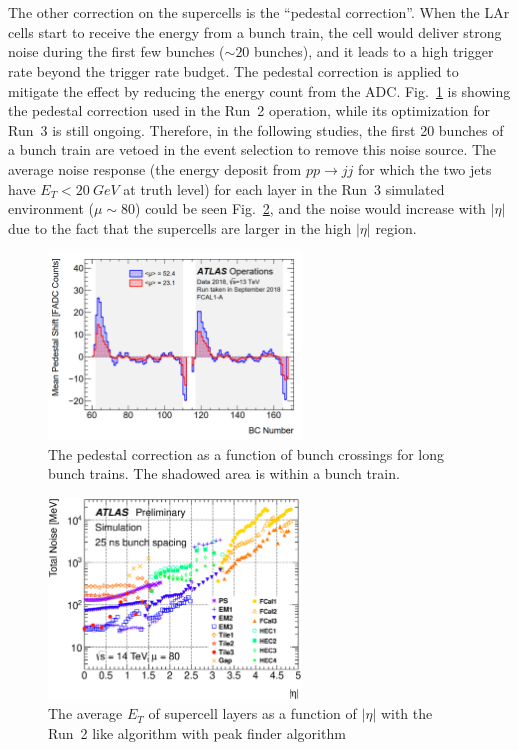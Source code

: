 \noindent
\\
\\The other correction on the supercells is the ``pedestal correction''. When the LAr cells start to receive the energy from a bunch train, the cell would deliver strong noise during the first few bunches ($\sim 20$ bunches), and it leads to a high trigger rate beyond the trigger rate budget. The pedestal correction is applied to mitigate the effect by reducing the energy count from the ADC. Fig.~\ref{Fig:pc} is showing the pedestal correction used in the Run~2 operation, while its optimization for Run~3 is still ongoing. Therefore, in the following studies, the first 20 bunches of a bunch train are vetoed in the event selection to remove this noise source. The average noise response (the energy deposit from $pp\to jj$ for which the two jets have $E_{T}<20~GeV$ at truth level) for each layer in the Run~3 simulated environment ($\mu\sim80$) could be seen Fig.~\ref{Fig:sc_noise}, and the noise would increase with $|\eta|$ due to the fact that the supercells are larger in the high $|\eta|$ region.
\begin{figure}[!h]                
  	\includegraphics[width=0.6\textwidth]{Chapter6/pedestalCorr.png}
  	\begin{center}
  		\caption{The pedestal correction as a function of bunch crossings for long bunch trains. The shadowed area is within a bunch train\cite{Jongmanns:2661780}.}
  		\label{Fig:pc}            
  	\end{center}
\end{figure}
\begin{figure}[!h]                
	\includegraphics[width=0.6\textwidth]{Chapter6/noise_tot_plot_OFLCOND-MC12-HPS-19-60-25.eps}
	\caption{The average $E_{T}$ of supercell layers as a function of $|\eta|$ with the Run~2 like algorithm with peak finder algorithm\cite{Aleksa:1602230}}
	\label{Fig:sc_noise}            
\end{figure}
